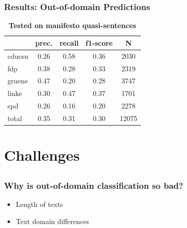 \documentclass[]{beamer}
\begin{document}
\begin{frame}\frametitle{Results: Out-of-domain Predictions}

\begin{table}[t]
\caption{
\label{tab:results_out-of-domain}
{\bf Tested on manifesto quasi-sentences}}
\begin{center}
\begin{tabular}{lcccc}
    &         prec.    &recall &  f1-score  & N  \\
\hline \hline
    cducsu    &   0.26   &   0.58   &   0.36    &   2030 \\
    fdp    &   0.38   &   0.28   &   0.33    &   2319 \\
     gruene   &    0.47    &  0.20   &   0.28    &  3747\\
      linke     &  0.30  &    0.47    &  0.37    &   1701\\
        spd     &  0.26  &    0.16   &   0.20    &   2278\\
\hline
total    &   0.35  &    0.31  &    0.30   &   12075\\
%
\end{tabular}
\end{center}

\end{table}

\end{frame}

\section{Challenges}
\subsection{}

\begin{frame}\frametitle{Why is out-of-domain classification so bad?}
\begin{itemize}
\item Length of texts
\vspace{2em}
\item Text domain differences
\end{itemize}
\end{frame}
\end{document}
